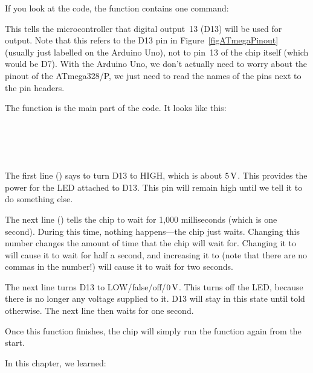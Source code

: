 If you look at the code, the  function contains one command: \\

This tells the microcontroller that digital output~13 (D13) will be used for output.  
Note that this refers to the D13 pin in Figure~\ref{figATmegaPinout} (usually just labelled  on the Arduino Uno), not to pin~13 of the chip itself (which would be D7).
With the Arduino Uno, we don't actually need to worry about the pinout of the ATmega328/P, we just need to read the names of the pins next to the pin headers.

The  function is the main part of the code. 
It looks like this: 

 \\
 \\
 \\
 \\

The first line () says to turn D13 to HIGH, which is about $5\,\si{\volt}$.
This provides the power for the LED attached to D13.
This pin will remain high until we tell it to do something else.

The next line () tells the chip to wait for 1,000 milliseconds (which is one second).
During this time, nothing happens---the chip just waits.
Changing this number changes the amount of time that the chip will wait for.
Changing it to  will cause it to wait for half a second, and increasing it to  (note that there are no commas in the number!) will cause it to wait for two seconds.

The next line turns D13 to LOW/false/off/$0\,\si{\volt}$.
This turns off the LED, because there is no longer any voltage supplied to it.
D13 will stay in this state until told otherwise.
The next line then waits for one second.

Once this function finishes, the chip will simply run the  function again from the start.

\reviewsection

In this chapter, we learned:

